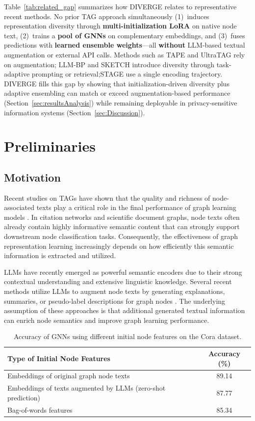 \documentclass[a4paper,fleqn]{cas-sc}
\begin{document}
Table~\ref{tab:related_gap} summarizes how DIVERGE relates to representative recent methods. No prior TAG approach simultaneously (1)~induces representation diversity through \textbf{multi-initialization LoRA} on native node text, (2)~trains a \textbf{pool of GNNs} on complementary embeddings, and (3)~fuses predictions with \textbf{learned ensemble weights}---all \textbf{without} LLM-based textual augmentation or external API calls. Methods such as TAPE and UltraTAG rely on augmentation; LLM-BP and SKETCH introduce diversity through task-adaptive prompting or retrieval;STAGE use a single encoding trajectory. DIVERGE fills this gap by showing that initialization-driven diversity plus adaptive ensembling can match or exceed augmentation-based performance (Section~\ref{sec:resultsAnalysis}) while remaining deployable in privacy-sensitive information systems (Section~\ref{sec:Discussion}).


\section{Preliminaries}\label{sec:Preliminaries}
\subsection{Motivation}

Recent studies on TAGs have shown that the quality and richness of node-associated texts play a critical role in the final performance of graph learning models \citep{he2024harnessing}. In citation networks and scientific document graphs, node texts often already contain highly informative semantic content that can strongly support downstream node classification tasks. Consequently, the effectiveness of graph representation learning increasingly depends on how efficiently this semantic information is extracted and utilized.

LLMs have recently emerged as powerful semantic encoders due to their strong contextual understanding and extensive linguistic knowledge. Several recent methods utilize LLMs to augment node texts by generating explanations, summaries, or pseudo-label descriptions for graph nodes \citep{he2024harnessing}. The underlying assumption of these approaches is that additional generated textual information can enrich node semantics and improve graph learning performance.



\begin{table}[h]
\caption{Accuracy of GNNs using different initial node features on the Cora dataset.}
\label{tab:gnn_features_comparison}

\begin{tabular*}{\linewidth}{@{\extracolsep{\fill}} lc @{}}
\toprule
\textbf{Type of Initial Node Features} & \textbf{Accuracy (\%)} \\
\midrule
Embeddings of original graph node texts & 89.14 \\
Embeddings of texts augmented by LLMs (zero-shot prediction) & 87.77 \\
Bag-of-words features & 85.34 \\
\bottomrule
\end{tabular*}
\end{table}
\end{document}
